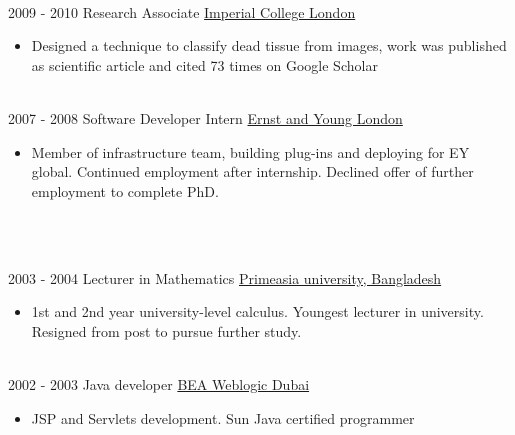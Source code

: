 \documentclass[letterpaper]{twentysecondcv} %
\begin{document}
\begin{twenty}
    \\   
    \twentyitem
   		{2009 -}
		{2010}
        {Research Associate}
        {\href{http://www.imperial.ac.uk}{Imperial College London}}
        {}
        {
        {\begin{itemize}
        \item Designed a technique to classify dead tissue from images, work was published as scientific article and cited 73 times on Google Scholar
    \end{itemize}}
        }
     \\
     \twentyitem
   		{2007 -}
		{2008}
        {Software Developer Intern}
        {\href{http://www.ey.com/}{Ernst and Young London}}
        {}
        {
        \begin{itemize}
        \item Member of infrastructure team, building plug-ins and deploying for EY global. Continued employment after internship. Declined offer of further employment to complete PhD.
        \end{itemize}
     	}   
    \\   

    	\\ 
      \twentyitem
   		{2003 -}
		{2004}
        {Lecturer in Mathematics}
        {\href{http://www.primeasia.edu.bd/}{Primeasia university, Bangladesh}}
        {
        \begin{itemize}
        \item 1st and 2nd year university-level calculus. Youngest lecturer in university. Resigned from post to pursue further study. 
 
        \end{itemize}
        }{}
	\\ 
      \twentyitem
   		{2002 - }
		{2003}
        {Java developer}
        {\href{https://en.wikipedia.org/wiki/BEA_Systems}{BEA Weblogic Dubai}}
		{
		\begin{itemize}
		\item JSP and Servlets development. Sun Java certified programmer
		\end{itemize}		
		}{}
	\\ 
     
        
        
\end{twenty}
\end{document}
